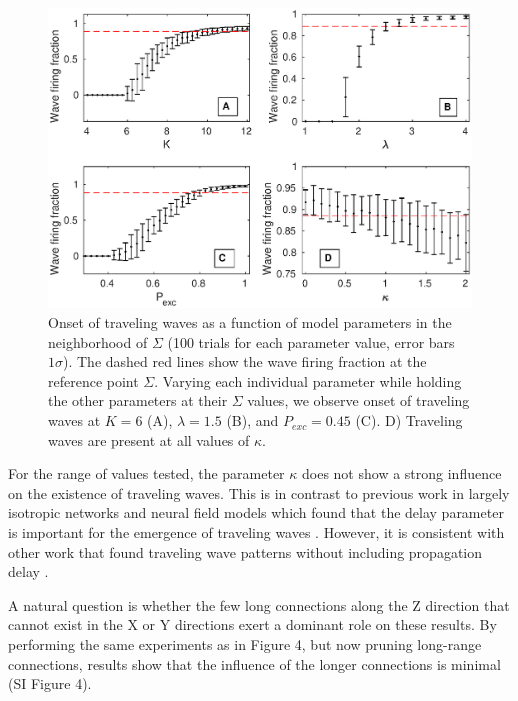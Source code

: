 \documentclass[12pt]{article}
\begin{document}
\begin{figure}[!htb]
 \centering
 \includegraphics[width=\textwidth]{fig/ParamWaveSim}
 \caption{Onset of traveling waves as a function of model parameters in the neighborhood of $\Sigma$ (100 trials for each parameter value, error bars $1\sigma$). 
         The dashed red lines show the wave firing fraction at the reference  point $\Sigma$.  
         Varying each individual parameter while holding the other parameters at their $\Sigma$ values, we observe onset of traveling waves at $K=6$ (A), $\lambda=1.5$ (B), and $P_{exc}=0.45$ (C).  
         D) Traveling waves are present at all values of $\kappa$. }
 \label{fig:wave_parameters}
\end{figure}

\FloatBarrier

For the range of values tested, the parameter $\kappa$ does not show a strong influence on the existence of traveling waves. 
This is in contrast to previous work in largely isotropic networks and neural field models which found that the delay parameter is important for the emergence of traveling waves \parencite{Senk2020}\parencite{Atay2006}\parencite{Roxin2005}.
However, it is consistent with other work that found traveling wave patterns without including propagation delay \parencite{Folias2012}\parencite{Wyller2007}.

A natural question is whether the few long connections along the Z direction that cannot exist in the X or Y directions exert a dominant role on these results.
By performing the same experiments as in Figure 4, but now pruning long-range connections, results show that the influence of the longer connections is minimal (SI Figure 4).
\end{document}
